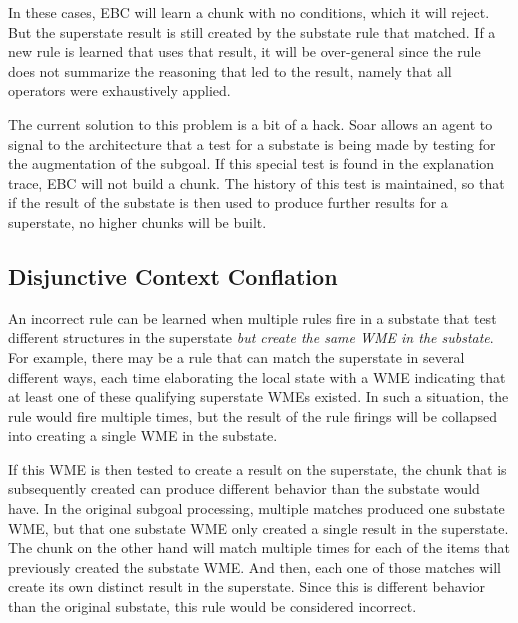 In these cases, EBC will learn a chunk with no conditions, which it will reject.  But the superstate result is still created by the substate rule that matched.  If a new rule is learned that uses that result, it will be over-general since the rule does not summarize the reasoning that led to the result, namely that all operators were exhaustively applied.

The current solution to this problem is a bit of a hack.  Soar allows an agent to signal to the architecture that a test for a substate is being made by testing for the  augmentation of the subgoal. If this special test is found in the explanation trace, EBC will not build a chunk. The history of this test is maintained, so that if the result of the substate is then used to produce further results for a superstate, no higher chunks will be built.

\subsection{Disjunctive Context Conflation}
\label{CHUNKING-subtleties-disjunctive}

An incorrect rule can be learned when multiple rules fire in a substate that test different structures in the superstate \emph{but create the same WME in the substate}. For example, there may be a rule that can match the superstate in several different ways, each time elaborating the local state with a WME indicating that at least one of these qualifying superstate WMEs existed. In such a situation, the rule would fire multiple times, but the result of the rule firings will be collapsed into creating a single WME in the substate.

If this WME is then tested to create a result on the superstate, the chunk that is subsequently created can produce different behavior than the substate would have. In the original subgoal processing, multiple matches produced one substate WME, but that one substate WME only created a single result in the superstate.  The chunk on the other hand will match multiple times for each of the items that previously created the substate WME.  And then, each one of those matches will create its own distinct result in the superstate.   Since this is different behavior than the original substate, this rule would be considered incorrect.

